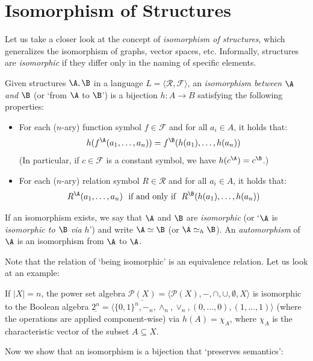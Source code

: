 \section{Isomorphism of Structures}\label{section:isomorphism-of-structures}

Let us take a closer look at the concept of \emph{isomorphism of structures}, which generalizes the isomorphism of graphs, vector spaces, etc. Informally, structures are \emph{isomorphic} if they differ only in the naming of specific elements.

\begin{definition}
Given structures $\A, \B$ in a language $L = \langle\mathcal{R}, \mathcal{F}\rangle$, an \emph{isomorphism between $\A$ and $\B$} (or `from $\A$ to $\B$') is a bijection $h\colon A \to B$ satisfying the following properties:
\begin{itemize}
    \item For each ($n$-ary) function symbol $f \in \mathcal{F}$ and for all $a_i \in A$, it holds that:
    $$
    h(f^\A(a_1, \dots, a_n)) = f^\B(h(a_1), \dots, h(a_n))
    $$
    (In particular, if $c \in \mathcal{F}$ is a constant symbol, we have $h(c^\A) = c^\B$.)
    \item For each ($n$-ary) relation symbol $R \in \mathcal{R}$ and for all $a_i \in A$, it holds that:
    $$
    R^\A(a_1, \dots, a_n)\ \text{ if and only if }\ R^\B(h(a_1), \dots, h(a_n))
    $$
\end{itemize}
If an isomorphism exists, we say that $\A$ and $\B$ are \emph{isomorphic} (or `$\A$ is \emph{isomorphic to $\B$ via $h$}') and write $\A \simeq \B$ (or $\A \simeq_h \B$). An \emph{automorphism} of $\A$ is an isomorphism from $\A$ to $\A$.
\end{definition}

Note that the relation of `being isomorphic' is an equivalence relation. Let us look at an example:

\begin{example}
    If $|X| = n$, the power set algebra $\underline{\mathcal{P}(X)} = \langle \mathcal{P}(X), -, \cap, \cup, \emptyset, X\rangle$ is isomorphic to the Boolean algebra $\underline{2^n} = \langle \{0,1\}^n, -_n, \land_n, \lor_n, (0, \dots, 0), (1, \dots, 1)\rangle$ (where the operations are applied component-wise) via $h(A) = \chi_A$, where $\chi_A$ is the characteristic vector of the subset $A \subseteq X$.
\end{example}

Now we show that an isomorphism is a bijection that `preserves semantics':

